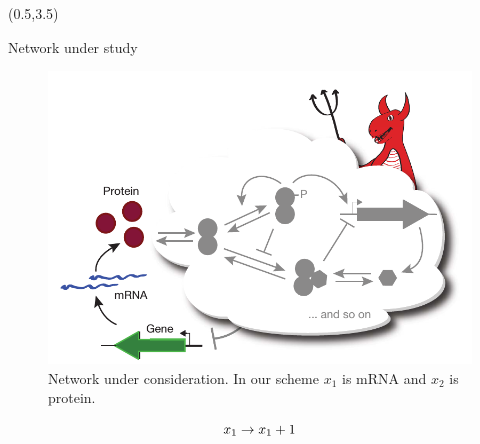 \documentclass{beamer}
\begin{document}
\begin{textblock}{7}(0.5,3.5)

    \begin{block}{Network under study}
        \begin{figure}
            \includegraphics[]{./fig_mrna_protein.png}
        \caption{Network under consideration. In our scheme $x_1$ is mRNA and
        $x_2$ is protein.}
        \label{fig:demon}
        \end{figure}
    
        \begin{equation}
            x_1 \rightarrow x_1 + 1 \\
        \end{equation}


    \end{block}

\end{textblock}
\end{document}
